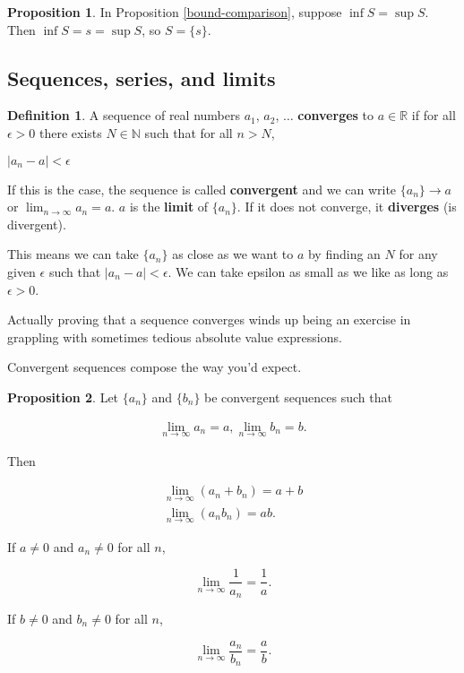\documentclass{article}
\theoremstyle{definition}
\newtheorem{definition}{Definition}[section]
\newtheorem{proposition}{Proposition}[section]
\begin{document}
\begin{proposition}
In Proposition \ref{bound-comparison}, suppose $\inf S = \sup S$. Then $\inf S = s = \sup S$, so $S = \{s\}$.
\end{proposition}

\subsection{Sequences, series, and limits}

\begin{definition} 
A sequence of real numbers $a_1$, $a_2$, $\ldots$ \textbf{converges} to $a \in \mathbb{R}$ if for all $\epsilon > 0$ there exists $N \in \mathbb{N}$ such that for all $n > N$,

\begin{center}
$|a_n - a| < \epsilon$
\end{center}

If this is the case, the sequence is called \textbf{convergent} and we can write $\{a_n\} \to a$ or $\lim_{n \to \infty} a_n = a$. $a$ is the \textbf{limit} of $\{a_n\}$. If it does not converge, it \textbf{diverges} (is divergent).
\end{definition}

This means we can take $\{a_n\}$ as close as we want to $a$ by finding an $N$ for any given $\epsilon$ such that $|a_n - a| < \epsilon$. We can take epsilon as small as we like as long as $\epsilon > 0$.

Actually proving that a sequence converges winds up being an exercise in grappling with sometimes tedious
absolute value expressions.

Convergent sequences compose the way you'd expect.

\pagebreak

\begin{proposition}
Let $\{a_n\}$ and $\{b_n\}$ be convergent sequences such that

\begin{align*}
\lim_{n \to \infty} a_n = a, \lim_{n \to \infty} b_n = b.
\end{align*}

Then

\begin{align*}
\lim_{n \to \infty} (a_n + b_n) = a + b \\
\lim_{n \to \infty} (a_n b_n) = ab.
\end{align*}

If $a \neq 0$ and $a_n \neq 0$ for all $n$,

\begin{equation*}
\lim_{n \to \infty} \frac{1}{a_n} = \frac{1}{a}.
\end{equation*}

If $b \neq 0$ and $b_n \neq 0$ for all $n$,

\begin{equation*}
\lim_{n \to \infty} \frac{a_n}{b_n} = \frac{a}{b}.
\end{equation*}

\end{proposition}
\end{document}
